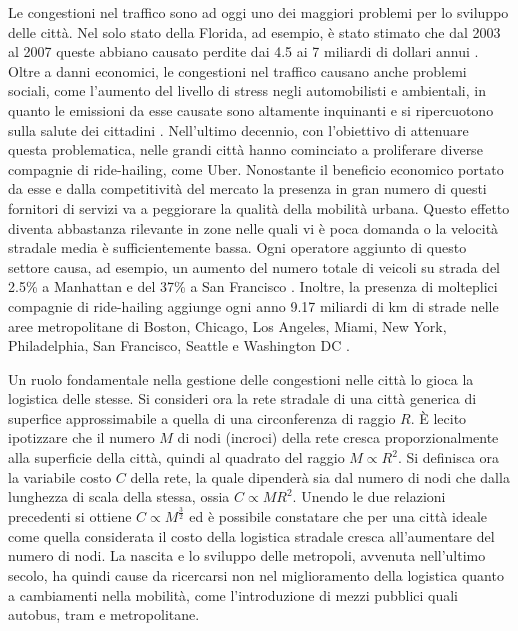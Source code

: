 \documentclass[../main.tex]{subfiles}
\begin{document}
Le congestioni nel traffico sono ad oggi uno dei maggiori problemi per lo sviluppo delle citt\`a.
Nel solo stato della Florida, ad esempio, \`e stato stimato che dal 2003 al 2007 queste abbiano causato perdite dai 4.5 ai 7 miliardi di dollari annui \cite{florida}.
Oltre a danni economici, le congestioni nel traffico causano anche problemi sociali, come l'aumento del livello di stress negli automobilisti \cite{hennessy1999traffic} e ambientali, in quanto le emissioni da esse causate sono altamente inquinanti e si ripercuotono sulla salute dei cittadini \cite{zhang2013air}.
Nell'ultimo decennio, con l'obiettivo di attenuare questa problematica, nelle grandi citt\`a hanno cominciato a proliferare diverse compagnie di ride-hailing, come Uber.
Nonostante il beneficio economico portato da esse e dalla competitivit\`a del mercato la presenza in gran numero di questi fornitori di servizi va a peggiorare la qualit\`a della mobilit\`a urbana.
Questo effetto diventa abbastanza rilevante in zone nelle quali vi \`e poca domanda o la velocit\`a stradale media \`e sufficientemente bassa.
Ogni operatore aggiunto di questo settore causa, ad esempio, un aumento del numero totale di veicoli su strada del 2.5\% a Manhattan e del 37\% a San Francisco \cite{Kondor2022}.
Inoltre, la presenza di molteplici compagnie di ride-hailing aggiunge ogni anno 9.17 miliardi di km di strade nelle aree metropolitane di Boston, Chicago, Los Angeles, Miami, New York, Philadelphia, San Francisco, Seattle e Washington DC \cite{schaller2018new}.

Un ruolo fondamentale nella gestione delle congestioni nelle citt\`a lo gioca la logistica delle stesse.
Si consideri ora la rete stradale di una citt\`a generica di superfice approssimabile a quella di una circonferenza di raggio $R$.
\`E lecito ipotizzare che il numero $M$ di nodi (incroci) della rete cresca proporzionalmente alla superficie della citt\`a, quindi al quadrato del raggio $M\propto R^2$.
Si definisca ora la variabile costo $C$ della rete, la quale dipender\`a sia dal numero di nodi che dalla lunghezza di scala della stessa, ossia $C\propto MR^2$.
Unendo le due relazioni precedenti si ottiene $C\propto M^\frac{3}{2}$ ed \`e possibile constatare che per una citt\`a ideale come quella considerata il costo della logistica stradale cresca all'aumentare del numero di nodi.
La nascita e lo sviluppo delle metropoli, avvenuta nell'ultimo secolo, ha quindi cause da ricercarsi non nel miglioramento della logistica quanto a cambiamenti nella mobilit\`a, come l'introduzione di mezzi pubblici quali autobus, tram e metropolitane.
\end{document}
